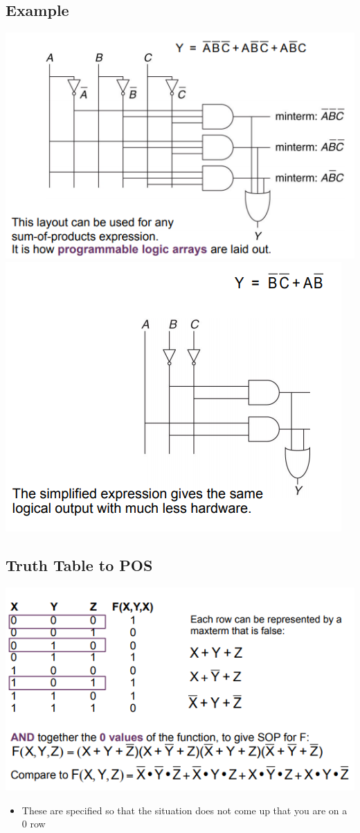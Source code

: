 \documentclass{article}[18pt]
\begin{document}
\subsection{Example}
\includegraphics[scale=0.7]{Example.png}\\
\includegraphics[scale=0.7]{Example2}

\subsection{Truth Table to POS}
\includegraphics[scale=0.7]{TruthToPOS.png}
\begin{itemize}
	\item These are specified so that the situation does not come up that you are on a 0 row
\end{itemize}
\end{document}
